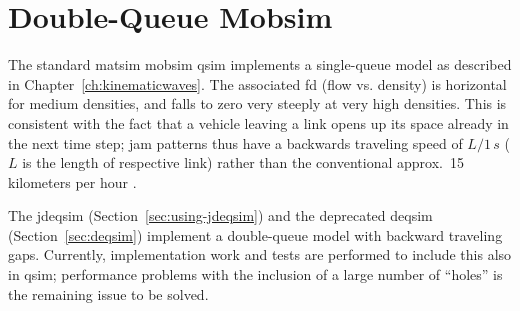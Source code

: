 

\section{Double-Queue Mobsim}
\label{sec:researchavenues-double-queue-mobsim}
The standard \gls{matsim} \gls{mobsim} \gls{qsim} implements a single-queue model as described in Chapter~\ref{ch:kinematicwaves}. The associated \gls{fd} (flow vs. density) is horizontal for medium densities, and falls to zero very steeply at very high densities. This is consistent with the fact that a vehicle leaving a link opens up its space already in the next time step; jam patterns thus have a backwards traveling speed of $L/1\,s$ ($L$ is the length of respective link) rather than the conventional approx.\ 15\,kilometers per hour \citep[see also][]{CharyparEtAl_TRB_2009}. 

The \gls{jdeqsim} (Section~\ref{sec:using-jdeqsim}) and the deprecated \gls{deqsim} (Section~\ref{sec:deqsim}) implement a double-queue model with backward traveling gaps. Currently, implementation work and tests are performed to include this also in \gls{qsim}; performance problems with the inclusion of a large number of ``holes'' is the remaining issue to be solved. 

